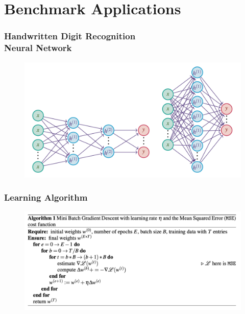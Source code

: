\documentclass{beamer}
\begin{document}
\section{Benchmark Applications}

\begin{frame}
  \frametitle{Handwritten Digit Recognition \\ Neural Network}

  \begin{figure}
    \centering
    \includegraphics[scale=0.37]{images/networks.png}
  \end{figure}

\end{frame}

\begin{frame}
  \frametitle{Learning Algorithm}

  \begin{figure}
    \centering
    \includegraphics[scale=0.37]{images/mSGD.png}
  \end{figure}

\end{frame}
\end{document}
